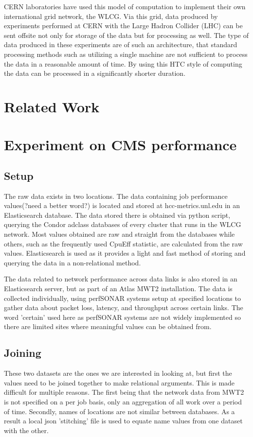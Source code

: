 \documentclass[]{scrartcl}
\begin{document}
CERN laboratories have used this model of computation to implement their own international grid network, the WLCG. Via this grid, data produced by experiments performed at CERN with the Large Hadron Collider (LHC) can be sent offsite not only for storage of the data but for processing as well. The type of data produced in these experiments are of such an architecture, that standard processing methods such as utilizing a single machine are not sufficient to process the data in a reasonable amount of time. By using this HTC style of computing the data can be processed in a significantly shorter duration.

\section{Related Work}

\section{Experiment on CMS performance}
\subsection{Setup}
The raw data exists in two locations. The data containing job performance values(?need a better word?) is located and stored at hcc-metrics.unl.edu in an Elasticsearch database. The data stored there is obtained via python script, querying the Condor adclass databases of every cluster that runs in the WLCG network. Most values obtained are raw and straight from the databases while others, such as the frequently used CpuEff statistic, are calculated from the raw values. Elasticsearch is used as it provides a light and fast method of storing and querying the data in a non-relational method.

The data related to network performance across data links is also stored in an Elasticsearch server, but as part of an Atlas MWT2 installation. The data is collected individually, using perfSONAR systems setup at specified locations to gather data about packet loss, latency, and throughput across certain links. The word 'certain' used here as perfSONAR systems are not widely implemented so there are limited sites where meaningful values can be obtained from.
\subsection{Joining}
These two datasets are the ones we are interested in looking at, but first the values need to be joined together to make relational arguments. This is made difficult for multiple reasons. The first being that the network data from MWT2 is not specified on a per job basis, only an aggregation of all work over a period of time. Secondly, names of locations are not similar between databases. As a result a local json 'stitching' file is used to equate name values from one dataset with the other. 
\end{document}
